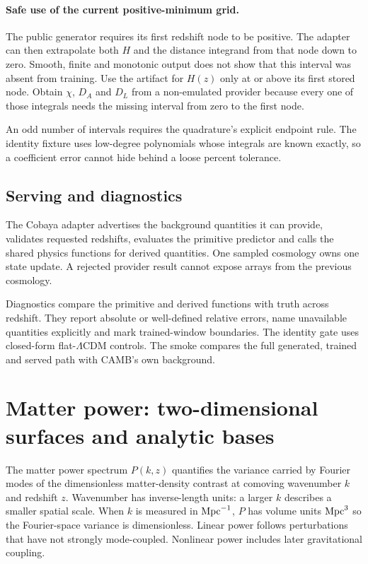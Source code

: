\documentclass[10pt,aps,prd,twocolumn,nofootinbib]{revtex4-2}
\begin{document}
\paragraph{Safe use of the current positive-minimum grid.}
The public generator requires its first redshift node to be positive.  The
adapter can then extrapolate both $H$ and the distance integrand from that node
down to zero.  Smooth, finite and monotonic output does not show that this
interval was absent from training.  Use the artifact for $H(z)$ only at or
above its first stored node.  Obtain $\chi$, $D_A$ and $D_L$ from a
non-emulated provider because every one of those integrals needs the missing
interval from zero to the first node.

An odd number of intervals requires the quadrature's explicit endpoint rule.
The identity fixture uses low-degree polynomials whose integrals are known
exactly, so a coefficient error cannot hide behind a loose percent tolerance.

\subsection{Serving and diagnostics}

The Cobaya adapter advertises the background quantities it can provide,
validates requested redshifts, evaluates the primitive predictor and calls
the shared physics functions for derived quantities.  One sampled cosmology
owns one state update.  A rejected provider result cannot expose arrays from
the previous cosmology.

Diagnostics compare the primitive and derived functions with truth across
redshift.  They report absolute or well-defined relative errors, name
unavailable quantities explicitly and mark trained-window boundaries.  The
identity gate uses closed-form flat-\(\Lambda\)CDM controls.  The smoke compares
the full generated, trained and served path with CAMB's own background.

\section{Matter power: two-dimensional surfaces and analytic bases}
\label{sec:mps}

The matter power spectrum $P(k,z)$ quantifies the variance carried by Fourier
modes of the dimensionless matter-density contrast at comoving wavenumber $k$
and redshift $z$.  Wavenumber has inverse-length units: a larger $k$ describes
a smaller spatial scale.  When $k$ is measured in ${\rm Mpc}^{-1}$, $P$ has
volume units ${\rm Mpc}^3$ so the Fourier-space variance is dimensionless.
Linear power follows perturbations that have not strongly mode-coupled.
Nonlinear power includes later gravitational coupling.
\end{document}
